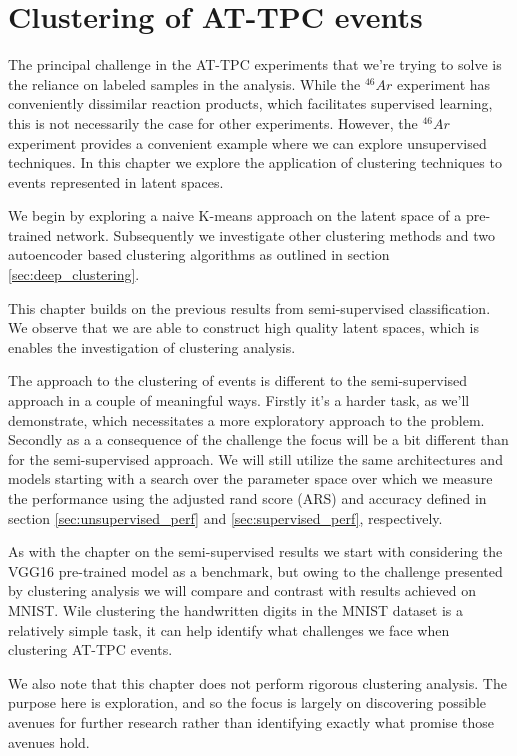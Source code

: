 \chapter{Clustering of AT-TPC events}\label{chap:clustering}

The principal challenge in the AT-TPC experiments that we're trying to solve is the reliance on labeled samples in the analysis. While the ${}^{46}Ar$ experiment has conveniently dissimilar reaction products, which facilitates supervised learning, this is not necessarily the case for other experiments. However, the ${}^{46}Ar$ experiment provides a convenient example where we can explore unsupervised techniques. In this chapter we explore the application of clustering techniques to events represented in latent spaces. 

We begin by exploring a naive K-means approach on the latent space of a pre-trained network. Subsequently we investigate other clustering methods and two autoencoder based clustering algorithms as outlined in section \ref{sec:deep_clustering}.

This chapter builds on the previous results from semi-supervised classification. We observe that we are able to construct high quality latent spaces, which is enables the investigation of clustering analysis. 

The approach to the clustering of events is different to the semi-supervised approach in a couple of meaningful ways. Firstly it's a harder task, as we'll demonstrate, which necessitates a more exploratory approach to the problem. Secondly as a a consequence of the challenge the focus will be a bit different than for the semi-supervised approach. We will still utilize the same architectures and models starting with a search over the parameter space over which we measure the performance using the adjusted rand score (ARS) and accuracy defined in section \ref{sec:unsupervised_perf} and \ref{sec:supervised_perf}, respectively.

As with the chapter on the semi-supervised results we start with considering the VGG16 pre-trained model as a benchmark, but owing to the challenge presented by clustering analysis we will compare and contrast with results achieved on MNIST. Wile clustering the handwritten digits in the MNIST dataset is a relatively simple task, it can help identify what challenges we face when clustering AT-TPC events. 

We also note that this chapter does not perform rigorous clustering analysis. The purpose here is exploration, and so the focus is largely on discovering possible avenues for further research rather than identifying exactly what promise those avenues hold. 